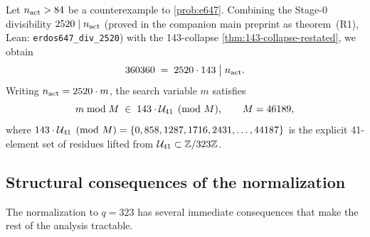 \begin{corollary}
\label{cor:full-divisibility}
Let $n_{\rm act} > 84$ be a counterexample to \cref{prob:e647}.
Combining the Stage-0 divisibility $2520 \mid n_{\rm act}$ (proved in
the companion main preprint as theorem~(R1), Lean: \texttt{erdos647\_div\_2520})
with the 143-collapse \cref{thm:143-collapse-restated}, we obtain
\[
360360 \;=\; 2520 \cdot 143 \;\big|\; n_{\rm act} .
\]
Writing $n_{\rm act} = 2520 \cdot m$, the search variable $m$ satisfies
\[
m \bmod M \;\in\; 143 \cdot \mathcal{U}_{41} \pmod{M} ,
\qquad M = 46189 ,
\]
where $143 \cdot \mathcal{U}_{41} \pmod{M} = \{0, 858, 1287, 1716, 2431, \ldots, 44187\}$
is the explicit 41-element set of residues lifted from $\mathcal{U}_{41} \subset \mathbb{Z}/323\mathbb{Z}$.
\end{corollary}

\subsection{Structural consequences of the normalization}
\label{sec:q323-consequences}

The normalization to $q = 323$ has several immediate consequences
that make the rest of the analysis tractable.

